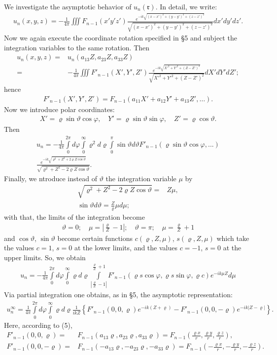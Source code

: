\documentclass[a4paper,11pt]{article}
\newcommand{\?}[2]{#1\footnote{\textsc{Translator note}: #2}}
\newcommand{\nequ}[2]{\begin{align*}\tag{#1}#2\end{align*}}
\newcommand{\uequ}[1]{\begin{align*}#1\end{align*}}
\renewcommand{\exp}[1]{e^{#1}}
\begin{document}
We investigate the asymptotic behavior of $u_n(\mathfrak{r})$. In detail, we write:
\uequ{
u_n(x,y,z) = -\frac{1}{4\pi}\iiint F_{n-1}(x'y'z')
\frac{\exp{-ik\sqrt{(x-x')^2+(y-y')^2+(z-z')^2}}}{\sqrt{(x-x')^2+(y-y')^2+(z-z')^2}}{dx'}{dy'}{dz'}.
}
Now we again execute the coordinate rotation specified in \S5 and subject the integration variables to the same rotation. Then
\nequ{4}{
u_n(x,y,z) = &u_n(a_{13}Z, a_{23}Z, a_{33}Z)\\
= &-\frac{1}{4\pi}\iiint F'_{n-1}(X',Y',Z')
\frac{\exp{-ik\sqrt{X'^2 + Y'^2 + (Z-Z')^2}}}{\sqrt{X'^2 + Y'^2 + (Z-Z')^2}} {dX'}{dY'}{dZ'};
}
hence
\nequ{5}{
F'_{n-1}(X',Y',Z') = F_{n-1}(a_{11}X' + a_{12}Y' + a_{13}Z', \dots).
}
Now we introduce polar coordinates:
\uequ{
X' = \varrho \sin\vartheta \cos\varphi,\quad
Y' = \varrho \sin\vartheta \sin\varphi,\quad
Z' = \varrho \cos\vartheta.
}
Then
\uequ{
u_n = -\frac{1}{4\pi}
\int\limits_0^{2\pi}d\varphi
\int\limits_0^\infty \varrho^2 d\varrho
\int\limits_0^\pi \sin\vartheta d\vartheta F'_{n-1}(\varrho\sin\vartheta\cos\varphi, ...)\\
\frac{\exp{-ik\sqrt{\varrho^2 + Z^2 + 2\varrho Z\cos\vartheta}}}{\sqrt{\varrho^2 + Z^2 - 2\varrho Z\cos\vartheta}}.
}
Finally, we ntroduce instead of $\vartheta$ the integration variable $\mu$ by
\uequ{
\sqrt{\varrho^2 + Z^2 - 2\varrho Z\cos\vartheta} = & Z\mu,\\
\sin\vartheta d\vartheta = \frac{Z}{\varrho}\mu{d\mu};
}
with that, the limits of the integration become
\uequ{
\vartheta = 0;\quad
\mu = \left|\frac{\varrho}{Z}-1\right|;\quad
\vartheta = \pi;\quad
\mu = \frac{\varrho}{Z} + 1
}
and $\cos\vartheta$, $\sin\vartheta$ become certain functions $c(\varrho,Z,\mu)$, $s(\varrho,Z,\mu)$ which take the values $c=1$, $s=0$ at the lower limits, and the values $c=-1$, $s=0$ at the upper limits. So, we obtain
\uequ{
u_n = -\frac{1}{4\pi}
\int\limits_0^{2\pi}d\varphi
\int\limits_0^\infty \varrho d\varrho \int\limits_{\left|\frac{\varrho}{Z}-1\right|}^{\frac{\varrho}{Z}+1} 
F'_{n-1}(\varrho s\cos\varphi, \varrho s\sin\varphi, \varrho c)\exp{-ik\mu Z}d\mu
}
Via partial integration one obtains, as in \S5, the asymptotic representation:
\uequ{
u_n^\infty = \frac{1}{4\pi}
\int\limits_0^{2\pi}d\varphi
\int\limits_0^\infty \varrho d\varrho
\frac{1}{ikZ}\left\{
F'_{n-1}(0, 0, \varrho)\exp{-ik(Z + \varrho)} - 
F'_{n-1}(0, 0, -\varrho)\exp{-ik\left|Z - \varrho\right|} 
\right\}.
}
Here, according to (5),
\uequ{
F'_{n-1}(0,0,\varrho) =& F_{n-1}(a_{13}\varrho,a_{23}\varrho, a_{33}\varrho)
 = F_{n-1}\left(\frac{\varrho x}{r}, \frac{\varrho y}{r}, \frac{\varrho z}{r}\right),\\
F'_{n-1}(0,0,-\varrho) = &F_{n-1}(-a_{13}\varrho,-a_{23}\varrho,-a_{33}\varrho)
= F_{n-1}\left(-\frac{\varrho x}{r}, -\frac{\varrho y}{r}, -\frac{\varrho z}{r}\right).
}
\end{document}
